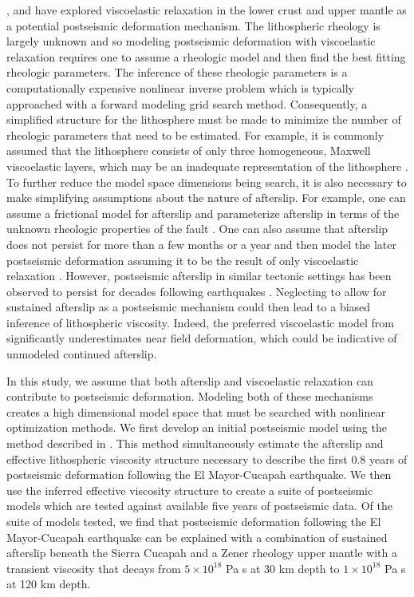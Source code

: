 \documentclass[1p]{elsarticle}
\begin{document}
\citet{Pollitz2012}, \citet{Rollins2015} and \citet{Spinler2015} have explored viscoelastic relaxation in the lower crust and upper mantle as a potential postseismic deformation mechanism. The lithospheric rheology is largely unknown and so modeling postseismic deformation with viscoelastic relaxation requires one to assume a rheologic model and then find the best fitting rheologic parameters.  The inference of these rheologic parameters is a computationally expensive nonlinear inverse problem which is typically approached with a forward modeling grid search method.  Consequently, a simplified structure for the lithosphere must be made to minimize the number of rheologic parameters that need to be estimated.  For example, it is commonly assumed that the lithosphere consists of only three homogeneous, Maxwell viscoelastic layers, which may be an inadequate representation of the lithosphere \citep[e.g.][]{Riva2009,Hines2013}. To further reduce the model space dimensions being search, it is also necessary to make simplifying assumptions about the nature of afterslip. For example, one can assume a frictional model for afterslip and parameterize afterslip in terms of the unknown rheologic properties of the fault \citep[e.g.][]{Johnson2009,Johnson2004}. One can also assume that afterslip does not persist for more than a few months or a year and then model the later postseismic deformation assuming it to be the result of only viscoelastic relaxation \citep[e.g.][]{Pollitz2012,Spinler2015}. However, postseismic afterslip in similar tectonic settings has been observed to persist for decades following earthquakes \citep{Cakir2012,Cetin2014}. Neglecting to allow for sustained afterslip as a postseismic mechanism could then lead to a biased inference of lithospheric viscosity. Indeed, the preferred viscoelastic model from \citet{Pollitz2012} significantly underestimates near field deformation, which could be indicative of unmodeled continued afterslip.

In this study, we assume that both afterslip and viscoelastic relaxation can contribute to postseismic deformation. Modeling both of these mechanisms creates a high dimensional model space that must be searched with nonlinear optimization methods. We first develop an initial postseismic model using the method described in \citet{Hines2015}. This method simultaneously estimate the afterslip and effective lithospheric viscosity structure necessary to describe the first 0.8 years of postseismic deformation following the El Mayor-Cucapah earthquake.  We then use the inferred effective viscosity structure to create a suite of postseismic models which are tested against available five years of postseismic data.  Of the suite of models tested, we find that postseismic deformation following the El Mayor-Cucapah earthquake can be explained with a combination of sustained afterslip beneath the Sierra Cucapah and a Zener rheology upper mantle with a transient viscosity that decays from $5\times10^{18}$ Pa s at 30 km depth to $1\times10^{18}$ Pa s at 120 km depth. 
\end{document}
